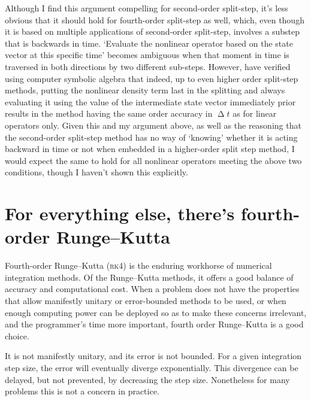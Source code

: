 Although I find this argument compelling for second-order split-step, it's less obvious that it should hold for fourth-order split-step as well, which, even though it is based on multiple applications of second-order split-step, involves a substep that is backwards in time. `Evaluate the nonlinear operator based on the state vector at this specific time' becomes ambiguous when that moment in time is traversed in both directions by two different sub-steps. However, \cite{javanainen_symbolic_2006} have verified using computer symbolic algebra that indeed, up to even higher order split-step methods, putting the nonlinear density term last in the splitting and always evaluating it using the value of the intermediate state vector immediately prior results in the method having the same order accuracy in $\upDelta t$ as for linear operators only. Given this and my argument above, as well as the reasoning that the second-order split-step method has no way of `knowing' whether it is acting backward in time or not when embedded in a higher-order split step method, I would expect the same to hold for all nonlinear operators meeting the above two conditions, though I haven't shown this explicitly.

\section{For everything else, there's fourth-order Runge--Kutta}\label{sec:rk4}

Fourth-order Runge--Kutta (\textsc{rk4}) is the enduring workhorse of numerical integration methods. Of the Runge--Kutta methods, it offers a good balance of accuracy and computational cost. When a problem does not have the properties that allow manifestly unitary or error-bounded methods to be used, or when enough computing power can be deployed so as to make these concerns irrelevant, and the programmer's time more important, fourth order Runge--Kutta is a good choice.

It is not manifestly unitary, and its error is not bounded. For a given integration step size, the error will eventually diverge exponentially. This divergence can be delayed, but not prevented, by decreasing the step size. Nonetheless for many problems this is not a concern in practice.

